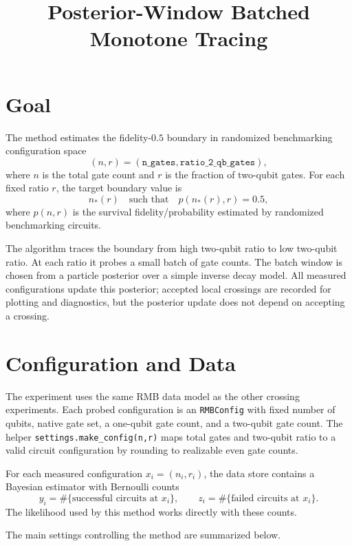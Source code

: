 \documentclass[11pt]{article}
\title{Posterior-Window Batched Monotone Tracing}
\author{}
\date{}
\begin{document}
\maketitle

\section{Goal}

The method estimates the fidelity-$0.5$ boundary in randomized benchmarking
configuration space
\[
    (n,r) =
    (\texttt{n\_gates}, \texttt{ratio\_2\_qb\_gates}),
\]
where $n$ is the total gate count and $r$ is the fraction of two-qubit gates.
For each fixed ratio $r$, the target boundary value is
\[
    n_*(r) \quad \text{such that} \quad p(n_*(r),r)=0.5,
\]
where $p(n,r)$ is the survival fidelity/probability estimated by randomized
benchmarking circuits.

The algorithm traces the boundary from high two-qubit ratio to low two-qubit
ratio. At each ratio it probes a small batch of gate counts. The batch window
is chosen from a particle posterior over a simple inverse decay model. All
measured configurations update this posterior; accepted local crossings are
recorded for plotting and diagnostics, but the posterior update does not
depend on accepting a crossing.

\section{Configuration and Data}

The experiment uses the same RMB data model as the other crossing experiments.
Each probed configuration is an \texttt{RMBConfig} with fixed number of qubits,
native gate set, a one-qubit gate count, and a two-qubit gate count. The helper
\texttt{settings.make\_config(n,r)} maps total gates and two-qubit ratio to a
valid circuit configuration by rounding to realizable even gate counts.

For each measured configuration $x_i=(n_i,r_i)$, the data store contains a
Bayesian estimator with Bernoulli counts
\[
    y_i = \#\{\text{successful circuits at } x_i\},
    \qquad
    z_i = \#\{\text{failed circuits at } x_i\}.
\]
The likelihood used by this method works directly with these counts.

The main settings controlling the method are summarized below.
\end{document}
